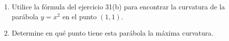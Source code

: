 \item 
    \begin{enumerate}
        \item[(a)] Utilice la fórmula del ejercicio 31(b) para encontrar la curvatura de la parábola $y = x^2$ en el punto $(1, 1)$.
        \item[(b)] Determine en qué punto tiene esta parábola la máxima curvatura.
    \end{enumerate}
